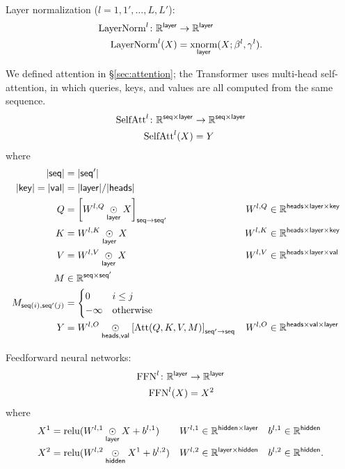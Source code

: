 \documentclass{article}
\newcommand{\reals}{\mathbb{R}}
\begin{document}
Layer normalization ($l = 1, 1', \ldots, L, L'$):
\begin{align*}
  \text{LayerNorm}^l \colon \mathbb{R}^{\mathsf{layer}} &\rightarrow \mathbb{R}^{\mathsf{layer}} \\
  \text{LayerNorm}^l(X) &= \mathop{\underset{\mathsf{layer}}{\mathrm{xnorm}}}(X; \beta^l, \gamma^l).
\end{align*}

We defined attention in \S\ref{sec:attention}; the Transformer uses multi-head self-attention, in which queries, keys, and values are all computed from the same sequence.
\begin{align*}
  \text{SelfAtt}^l \colon \mathbb{R}^{\mathsf{seq} \times \mathsf{layer}} &\rightarrow \mathbb{R}^{\mathsf{seq} \times \mathsf{layer}} \\
  \text{SelfAtt}^l(X) &= Y
\end{align*}
where
\begin{align*}
  |\name{seq}| &= |\name{seq'}| \\
  |\name{key}| = |\name{val}| &= |\name{layer}|/|\name{heads}| \\
  Q &= \nmov{seq}{seq'}{W^{l,Q} \ndot{layer} X} & W^{l,Q} &\in \mathbb{R}^{\name{heads} \times \name{layer} \times \name{key}} \\
  K &= W^{l,K} \ndot{layer} X & W^{l,K} &\in \mathbb{R}^{\name{heads} \times \name{layer} \times \name{key}} \\
  V &= W^{l,V} \ndot{layer} X & W^{l,V} &\in \mathbb{R}^{\name{heads} \times \name{layer} \times \name{val}} \\
  M & \in \reals^{\name{seq} \times \name{seq'}} \\
  M_{\nidx{seq}{i}, \nidx{seq'}{j}} &= \begin{cases}
    0 & i \leq j\\
    -\infty & \text{otherwise}
  \end{cases} \\
  Y &= W^{l,O} \ndot{heads,val} \nmov{seq'}{seq}{\text{Att}(Q, K, V, M)} & W^{l,O} &\in \mathbb{R}^{\name{heads} \times \name{val} \times \name{layer}}
\end{align*}

Feedforward neural networks:
\begin{align*}
  \text{FFN}^l \colon \mathbb{R}^{\mathsf{layer}} &\rightarrow \mathbb{R}^{\mathsf{layer}} \\
  \text{FFN}^l(X) &= X^2
\end{align*}
where
\begin{align*}
  X^1 &= \text{relu}(W^{l,1} \mathbin{\underset{\mathsf{layer}}{\odot}} X + b^{l,1}) & W^{l,1} &\in \mathbb{R}^{\mathsf{hidden} \times \mathsf{layer}} & b^{l,1} &\in \mathbb{R}^{\mathsf{hidden}} \\
  X^2 &= \text{relu}(W^{l,2} \mathbin{\underset{\mathsf{hidden}}{\odot}} X^1 + b^{l,2}) & W^{l,2} &\in \mathbb{R}^{\mathsf{layer} \times \mathsf{hidden}} & b^{l,2} &\in \mathbb{R}^{\mathsf{hidden}}.
\end{align*}
\end{document}
